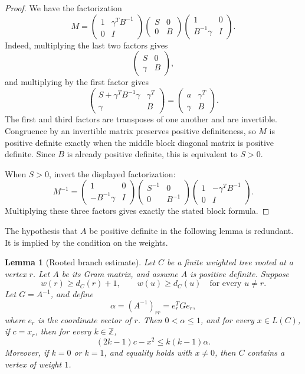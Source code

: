 \documentclass[12pt]{article}
\newcommand{\Z}{\mathbb{Z}}
\newtheorem{lemma}[theorem]{Lemma}
\newcommand{\review}[1]{\begin{reviewbox}#1\end{reviewbox}}
\begin{document}
\begin{proof}
We have the factorization
\[
M=
\begin{pmatrix}
1 & \gamma^T B^{-1}\\
0 & I
\end{pmatrix}
\begin{pmatrix}
S & 0\\
0 & B
\end{pmatrix}
\begin{pmatrix}
1 & 0\\
B^{-1}\gamma & I
\end{pmatrix}.
\]
Indeed, multiplying the last two factors gives
\[
\begin{pmatrix}
S & 0\\
\gamma & B
\end{pmatrix},
\]
and multiplying by the first factor gives
\[
\begin{pmatrix}
S+\gamma^T B^{-1}\gamma & \gamma^T\\
\gamma & B
\end{pmatrix}
=
\begin{pmatrix}
a & \gamma^T\\
\gamma & B
\end{pmatrix}.
\]
The first and third factors are transposes of one another and are invertible. Congruence by an invertible matrix preserves positive definiteness, so \(M\) is positive definite exactly when the middle block diagonal matrix is positive definite. Since \(B\) is already positive definite, this is equivalent to \(S>0\).

When \(S>0\), invert the displayed factorization:
\[
M^{-1}=
\begin{pmatrix}
1 & 0\\
-B^{-1}\gamma & I
\end{pmatrix}
\begin{pmatrix}
S^{-1} & 0\\
0 & B^{-1}
\end{pmatrix}
\begin{pmatrix}
1 & -\gamma^T B^{-1}\\
0 & I
\end{pmatrix}.
\]
Multiplying these three factors gives exactly the stated block formula.
\end{proof}
\review{The hypothesis that $A$ be positive definite in the following lemma is redundant. It is implied by the condition on the weights.}
\begin{lemma}[Rooted branch estimate]\label{lem:branch}
Let \(C\) be a finite weighted tree rooted at a vertex \(r\). Let \(A\) be its Gram matrix, and assume \(A\) is positive definite. Suppose
\[
w(r)\ge d_C(r)+1,
\qquad
w(u)\ge d_C(u)\quad\text{for every }u\ne r.
\]
Let \(G=A^{-1}\), and define
\[
\alpha=(A^{-1})_{rr}=e_r^TGe_r,
\]
where \(e_r\) is the coordinate vector of \(r\). Then \(0<\alpha\le 1\), and for every \(x\in L(C)\), if \(c=x_r\), then for every \(k\in\Z\),
\[
(2k-1)c-x^2\le k(k-1)\alpha.
\]
Moreover, if \(k=0\) or \(k=1\), and equality holds with \(x\ne 0\), then \(C\) contains a vertex of weight \(1\).
\end{lemma}
\end{document}
